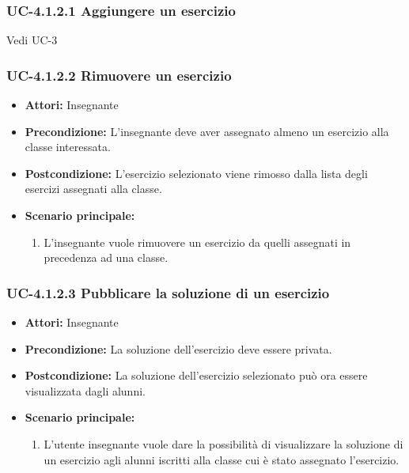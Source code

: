 \subsubsection{UC-4.1.2.1 Aggiungere un esercizio}
Vedi UC-3
\subsubsection{UC-4.1.2.2 Rimuovere un esercizio}
\begin{itemize}
		\item \textbf{Attori: } Insegnante
		\item \textbf{Precondizione: }  L'insegnante deve aver assegnato almeno un esercizio alla classe interessata.
		\item \textbf{Postcondizione: } L'esercizio selezionato viene rimosso dalla lista degli esercizi assegnati alla classe. 
		\item \textbf{Scenario principale: } 
		\begin{enumerate}
			\item L'insegnante vuole rimuovere un esercizio da quelli assegnati in precedenza ad una classe.
		\end{enumerate}
	\end{itemize}
\subsubsection{UC-4.1.2.3 Pubblicare la soluzione di un esercizio}
\begin{itemize}
		\item \textbf{Attori: } Insegnante
		\item \textbf{Precondizione: }  La soluzione dell'esercizio deve essere privata.
		\item \textbf{Postcondizione: } La soluzione dell'esercizio selezionato può ora essere visualizzata dagli alunni.
		\item \textbf{Scenario principale: } 
		\begin{enumerate}
			\item L'utente insegnante vuole dare la possibilità di visualizzare la soluzione di un esercizio agli alunni iscritti alla classe cui è stato assegnato l'esercizio.
		\end{enumerate}
	\end{itemize}
